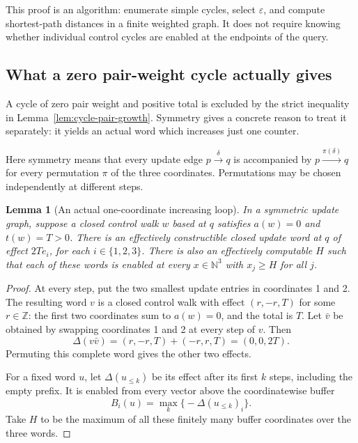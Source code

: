 \documentclass[11pt,a4paper]{article}
\newtheorem{lemma}[theorem]{Lemma}
\theoremstyle{definition}
\theoremstyle{remark}
\newcommand{\N}{\mathbb N}
\newcommand{\Z}{\mathbb Z}
\begin{document}
This proof is an algorithm: enumerate simple cycles, select
\(\varepsilon\), and compute shortest-path distances in a finite
weighted graph. It does not require knowing whether individual
control cycles are enabled at the endpoints of the query.

\subsection{What a zero pair-weight cycle actually gives}

A cycle of zero pair weight and positive total is excluded by the
strict inequality in Lemma~\ref{lem:cycle-pair-growth}. Symmetry gives
a concrete reason to treat it separately: it yields an actual word
which increases just one counter.

Here symmetry means that every update edge \(p\xrightarrow{\delta}q\)
is accompanied by \(p\xrightarrow{\pi(\delta)}q\) for every permutation
\(\pi\) of the three coordinates. Permutations may be chosen
independently at different steps.

\begin{lemma}[An actual one-coordinate increasing loop]
\label{lem:zero-pair-loop}
In a symmetric update graph, suppose a closed control walk \(w\)
based at \(q\) satisfies \(a(w)=0\) and \(t(w)=T>0\).
There is an effectively constructible closed update word at \(q\)
of effect \(2T e_i\), for each \(i\in\{1,2,3\}\).
There is also an effectively computable \(H\) such that each of these
words is enabled at every \(x\in\N^3\) with \(x_j\ge H\) for all \(j\).
\end{lemma}
\begin{proof}
At every step, put the two smallest update entries in coordinates
1 and 2. The resulting word \(v\) is a closed control walk with
effect \((r,-r,T)\) for some \(r\in\Z\): the first two coordinates
sum to \(a(w)=0\), and the total is \(T\).
Let \(\bar v\) be obtained by swapping coordinates 1 and 2 at every
step of \(v\). Then
\[
 \Delta(v\bar v)=(r,-r,T)+(-r,r,T)=(0,0,2T).
\]
Permuting this complete word gives the other two effects.

For a fixed word \(u\), let \(\Delta(u_{\le k})\) be its effect after
its first \(k\) steps, including the empty prefix. It is enabled from
every vector above the coordinatewise buffer
\[
 B_i(u)=\max_k\bigl\{-\Delta(u_{\le k})_i\bigr\}.
\]
Take \(H\) to be the maximum of all these finitely many buffer
coordinates over the three words.
\end{proof}
\end{document}
